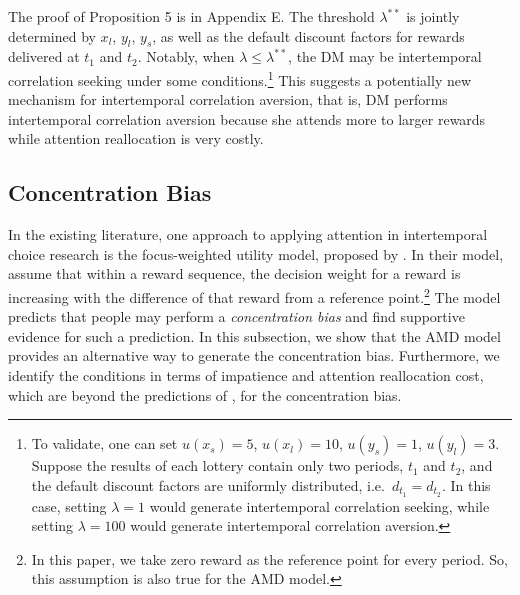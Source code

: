\documentclass[
  12pt,
]{article}
\begin{document}
The proof of Proposition 5 is in Appendix E. The threshold
\(\lambda^{**}\) is jointly determined by \(x_l\), \(y_l\), \(y_s\), as
well as the default discount factors for rewards delivered at \(t_1\)
and \(t_2\). Notably, when \(\lambda \leq \lambda^{**}\), the DM may be
intertemporal correlation seeking under some conditions.\footnote{To
  validate, one can set \(u(x_s)=5\), \(u(x_l)=10\), \(u(y_s)=1\),
  \(u(y_l)=3\). Suppose the results of each lottery contain only two
  periods, \(t_1\) and \(t_2\), and the default discount factors are
  uniformly distributed, i.e.~\(d_{t_1}=d_{t_2}\). In this case, setting
  \(\lambda=1\) would generate intertemporal correlation seeking, while
  setting \(\lambda=100\) would generate intertemporal correlation
  aversion.} This suggests a potentially new mechanism for intertemporal
correlation aversion, that is, DM performs intertemporal correlation
aversion because she attends more to larger rewards while attention
reallocation is very costly.

\hypertarget{concentration-bias}{%
\subsection{Concentration Bias}\label{concentration-bias}}

In the existing literature, one approach to applying attention in
intertemporal choice research is the focus-weighted utility model,
proposed by \citet{kHoszegi2013model}. In their model,
\citeauthor{kHoszegi2013model} assume that within a reward sequence, the
decision weight for a reward is increasing with the difference of that
reward from a reference point.\footnote{In this paper, we take zero
  reward as the reference point for every period. So, this assumption is
  also true for the AMD model.} The model predicts that people may
perform a \emph{concentration bias} and
\citet{dertwinkel2022concentration} find supportive evidence for such a
prediction. In this subsection, we show that the AMD model provides an
alternative way to generate the concentration bias. Furthermore, we
identify the conditions in terms of impatience and attention
reallocation cost, which are beyond the predictions of
\citet{kHoszegi2013model}, for the concentration bias.
\end{document}

